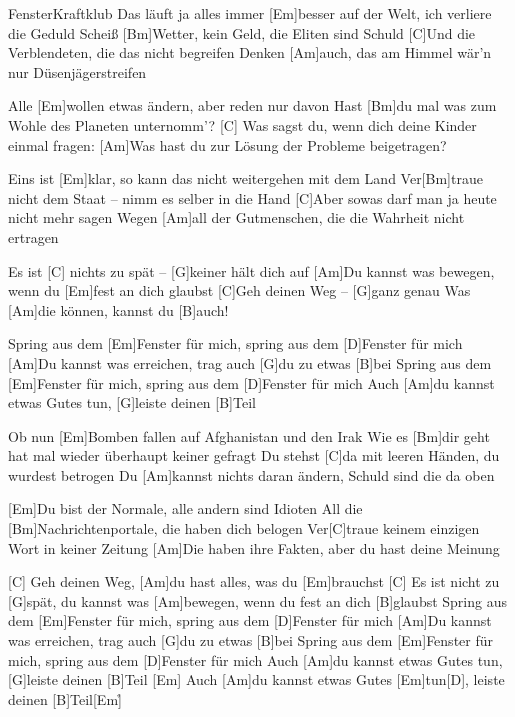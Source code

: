 \documentclass[../main.tex]{subfiles}
\begin{document}
\begin{song}{Fenster}{Kraftklub}{}
Das läuft ja alles immer [Em]besser auf der Welt, ich verliere die Geduld
Scheiß [Bm]Wetter, kein Geld, die Eliten sind Schuld
[C]Und die Verblendeten, die das nicht begreifen
Denken [Am]auch, das am Himmel wär'n nur Düsenjägerstreifen

Alle [Em]wollen etwas ändern, aber reden nur davon
Hast [Bm]du mal was zum Wohle des Planeten unternomm'?
[C]  Was sagst du, wenn dich deine Kinder einmal fragen:
[Am]\glqq{}Was hast du zur Lösung der Probleme beigetragen?\grqq{}

Eins ist [Em]klar, so kann das nicht weitergehen mit dem Land
Ver[Bm]traue nicht dem Staat – nimm es selber in die Hand
[C]Aber sowas darf man ja heute nicht mehr sagen
Wegen [Am]all der Gutmenschen, die die Wahrheit nicht ertragen

Es ist [C]  nichts zu spät – [G]keiner hält dich auf
[Am]Du kannst was bewegen, wenn du [Em]fest an dich glaubst
[C]Geh deinen Weg – [G]ganz genau
Was [Am]die können, kannst du [B]auch!

Spring aus dem [Em]Fenster für mich, spring aus dem [D]Fenster für mich
[Am]Du kannst was erreichen, trag auch [G]du zu etwas [B]bei
Spring aus dem [Em]Fenster für mich, spring aus dem [D]Fenster für mich
Auch [Am]du kannst etwas Gutes tun, [G]leiste deinen [B]Teil

Ob nun [Em]Bomben fallen auf Afghanistan und den Irak
Wie es [Bm]dir geht hat mal wieder überhaupt keiner gefragt
Du stehst [C]da mit leeren Händen, du wurdest betrogen
Du [Am]kannst nichts daran ändern, Schuld sind die da oben

[Em]Du bist der Normale, alle andern sind Idioten
All die [Bm]Nachrichtenportale, die haben dich belogen
Ver[C]traue keinem einzigen Wort in keiner Zeitung
[Am]Die haben ihre Fakten, aber du hast deine Meinung

[C] \hh [G]Geh deinen Weg, [Am]du hast alles, was du [Em]brauchst
[C] \hh Es ist nicht zu [G]spät, du kannst was [Am]bewegen, wenn du fest an dich [B]glaubst
Spring aus dem [Em]Fenster für mich, spring aus dem [D]Fenster für mich
[Am]Du kannst was erreichen, trag auch [G]du zu etwas [B]bei
Spring aus dem [Em]Fenster für mich, spring aus dem [D]Fenster für mich
Auch [Am]du kannst etwas Gutes tun, [G]leiste deinen [B]Teil
[Em] \hh [D] \hh Auch [Am]du kannst etwas Gutes [Em]tun[D], \hh[G]leiste deinen [B]Teil[Em]{\h}
\end{song}
\end{document}
